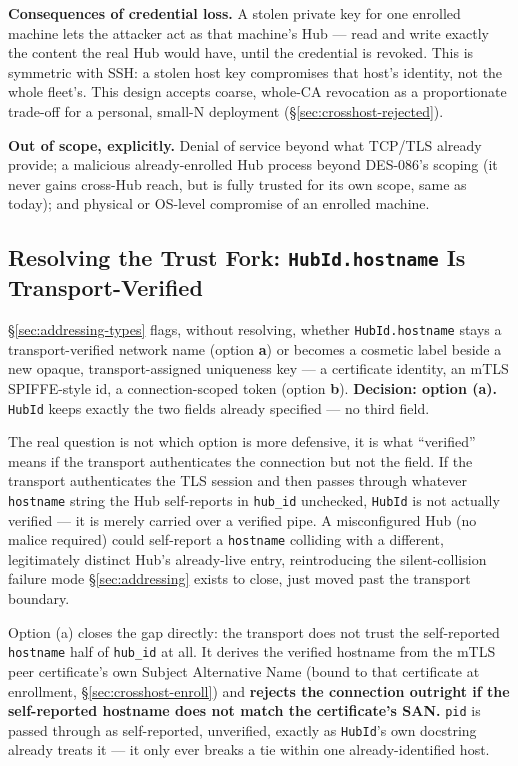 \documentclass[a4paper,10pt]{article}
\newcommand{\field}[1]{\texttt{#1}}
\begin{document}
\textbf{Consequences of credential loss.}  A stolen private key for one
enrolled machine lets the attacker act as that machine's Hub --- read and
write exactly the content the real Hub would have, until the credential is
revoked.  This is symmetric with SSH: a stolen host key compromises that
host's identity, not the whole fleet's.  This design accepts coarse,
whole-CA revocation as a proportionate trade-off for a personal, small-N
deployment (\S\ref{sec:crosshost-rejected}).

\textbf{Out of scope, explicitly.}  Denial of service beyond what TCP/TLS
already provide; a malicious already-enrolled Hub process beyond DES-086's
scoping (it never gains cross-Hub reach, but is fully trusted for its own
scope, same as today); and physical or OS-level compromise of an enrolled
machine.

\subsection{Resolving the Trust Fork: \texttt{HubId.hostname} Is Transport-Verified}\label{sec:crosshost-fork}

\S\ref{sec:addressing-types} flags, without resolving, whether
\field{HubId.hostname} stays a transport-verified network name (option
\textbf{a}) or becomes a cosmetic label beside a new opaque, transport-assigned
uniqueness key --- a certificate identity, an mTLS SPIFFE-style id, a
connection-scoped token (option \textbf{b}).  \textbf{Decision: option
(a).}  \texttt{HubId} keeps exactly the two fields already specified ---
no third field.

The real question is not which option is more defensive, it is what
``verified'' means if the transport authenticates the connection but not
the field.  If the transport authenticates the TLS session and then passes
through whatever \field{hostname} string the Hub self-reports in
\field{hub\_id} unchecked, \texttt{HubId} is not actually verified --- it is
merely carried over a verified pipe.  A misconfigured Hub (no malice
required) could self-report a \field{hostname} colliding with a different,
legitimately distinct Hub's already-live entry, reintroducing the
silent-collision failure mode \S\ref{sec:addressing} exists to close, just
moved past the transport boundary.

Option (a) closes the gap directly: the transport does not trust the
self-reported \field{hostname} half of \field{hub\_id} at all.  It derives
the verified hostname from the mTLS peer certificate's own Subject
Alternative Name (bound to that certificate at enrollment,
\S\ref{sec:crosshost-enroll}) and \textbf{rejects the connection outright
if the self-reported hostname does not match the certificate's SAN.}
\field{pid} is passed through as self-reported, unverified, exactly as
\texttt{HubId}'s own docstring already treats it --- it only ever breaks a
tie within one already-identified host.
\end{document}
